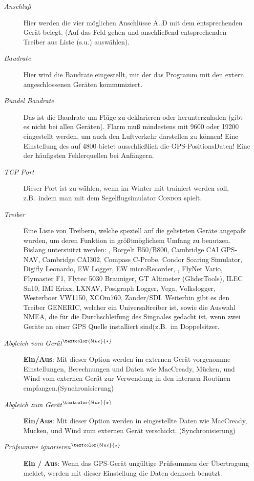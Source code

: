 \begin{description}
\item[\textit{Anschluß}]  Hier werden die vier möglichen Anschlüsse A..D mit dem entsprechenden Gerät belegt. (Auf das Feld gehen und anschließend entsprechenden Treiber aus Liste (s.u.) auswählen).
\item[\textit{Baudrate}]  Hier wird die Baudrate eingestellt, mit der das Programm mit den extern angeschlossenen Geräten kommuniziert.
\item[\textit{Bündel Baudrate}]  Das ist die Baudrate um Flüge zu deklarieren oder herunterzuladen (gibt es nicht bei allen Geräten).
\achtung Flarm muß  mindestens mit 9600 oder 19200 eingestellt werden, um auch den Luftverkehr darstellen zu können! Eine Einstellung des \fl auf 4800 bietet ausschließlich die GPS-PositionsDaten! Eine der häufigsten  Fehlerquellen bei Anfängern.
\item[\textit{TCP Port}]  Dieser Port ist zu wählen, wenn  im Winter mit \xc trainiert werden soll, z.B.\ indem man  mit dem
Segelflugsimulator \textsc{Condor} spielt.
\item[\textit{Treiber}] Eine Liste von Treibern, welche speziell auf die gelisteten Geräte angepaßt wurden, um deren Funktion in größtmöglichem Umfang zu benutzen.
Bislang unterstützt werden: \al, Borgelt B50/B800, Cambridge CAI GPS-NAV, Cambridge CAI302, Compass C-Probe, Condor Soaring Simulator, Digifly Leonardo,  EW Logger, EW microRecorder,
\fl, FlyNet Vario, Flymaster F1, Flytec 5030 Brauniger, GT Altimeter (GliderTools), ILEC Sn10, IMI Erixx, LXNAV, Posigraph Logger, Vega, Volkslogger, Westerboer VW1150, XCOm760, Zander/SDI.
Weiterhin gibt es den Treiber GENERIC, welcher ein Universaltreiber ist, sowie die Auswahl NMEA, die für die Durchschleifung des Singnales gedacht ist, wenn zwei Geräte an einer GPS Quelle installiert sind(z.B.\ im Doppelsitzer.
\item[\textit{Abgleich vom Gerät$^{\textcolor{blue}{\star}}$}]  {\bf Ein/Aus}: Mit dieser Option werden im externen Gerät vorgenomme Einstellungen, Berechnungen und Daten wie MacCready, Mücken, und Wind vom externen Gerät zur Verwendung in den internen Routinen empfangen.(Synchronisierung)
\item[\textit{Abgleich zum Gerät$^{\textcolor{blue}{\star}}$}]  {\bf Ein/Aus}: Mit dieser Option werden in \xc eingestellte Daten wie MacCready, Mücken, und Wind zum externen Gerät verschickt. (Synchronisierung)
\item[\textit{Prüfsumme ignorieren$^{\textcolor{blue}{\star}}$}] {\bf Ein / Aus}: Wenn das GPS-Gerät ungültige Prüfsummen der Übertragung meldet, werden mit
dieser Einstellung  die Daten dennoch benutzt.
\end{description}


